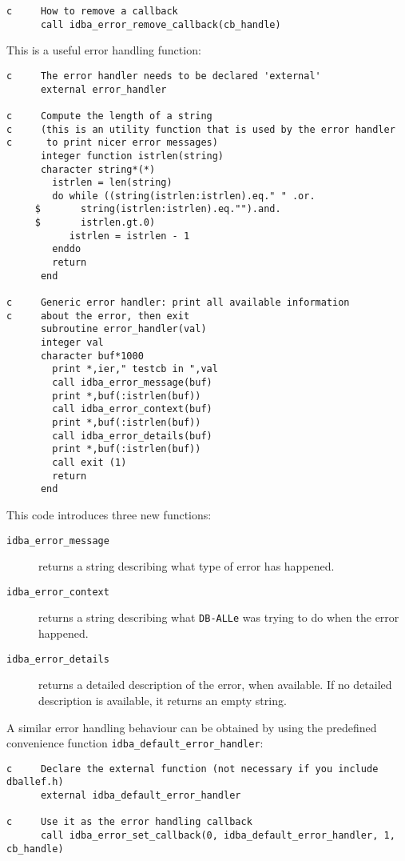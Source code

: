 \documentclass[final,12pt,a4paper,twoside]{book}
\newcommand{\dballe}{{\tt DB-ALLe}}
\begin{document}
\begin{verbatim}
c     How to remove a callback
      call idba_error_remove_callback(cb_handle)
\end{verbatim}

This is a useful error handling function:

\begin{verbatim}
c     The error handler needs to be declared 'external'
      external error_handler

c     Compute the length of a string
c     (this is an utility function that is used by the error handler
c      to print nicer error messages)
      integer function istrlen(string)
      character string*(*)
        istrlen = len(string)
        do while ((string(istrlen:istrlen).eq." " .or.
     $       string(istrlen:istrlen).eq."").and.
     $       istrlen.gt.0)
           istrlen = istrlen - 1
        enddo
        return
      end

c     Generic error handler: print all available information
c     about the error, then exit
      subroutine error_handler(val)
      integer val
      character buf*1000
        print *,ier," testcb in ",val
        call idba_error_message(buf)
        print *,buf(:istrlen(buf))
        call idba_error_context(buf)
        print *,buf(:istrlen(buf))
        call idba_error_details(buf)
        print *,buf(:istrlen(buf))
        call exit (1)
        return
      end
\end{verbatim}

This code introduces three new functions:

\begin{description}
\item[{\tt idba\_error\_message}]
  returns a string describing what type of error has happened.
\item[{\tt idba\_error\_context}]
  returns a string describing what \dballe{} was trying to do when the error
  happened.
\item[{\tt idba\_error\_details}]
  returns a detailed description of the error, when available.  If no detailed
  description is available, it returns an empty string.
\end{description}

A similar error handling behaviour can be obtained by using the predefined
convenience function {\tt idba\_default\_error\_handler}:

\label{fun-error-handler}

\begin{verbatim}
c     Declare the external function (not necessary if you include dballef.h)
      external idba_default_error_handler

c     Use it as the error handling callback
      call idba_error_set_callback(0, idba_default_error_handler, 1, cb_handle)
\end{verbatim}
\end{document}
